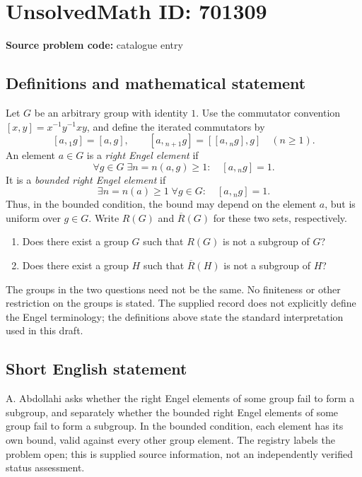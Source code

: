 \documentclass[11pt]{article}
\begin{document}
\section*{UnsolvedMath ID: 701309}
\textbf{Source problem code:} catalogue entry
\subsection{Definitions and mathematical statement}
Let \(G\) be an arbitrary group with identity \(1\). Use the commutator convention \([x,y]=x^{-1}y^{-1}xy\), and define the iterated commutators by
\[
[a,{}_1 g]=[a,g],\qquad [a,{}_{n+1}g]=[[a,{}_n g],g]\quad(n\geq 1).
\]
An element \(a\in G\) is a \emph{right Engel element} if
\[
\forall g\in G\;\exists n=n(a,g)\geq 1:\quad [a,{}_n g]=1.
\]
It is a \emph{bounded right Engel element} if
\[
\exists n=n(a)\geq 1\;\forall g\in G:\quad [a,{}_n g]=1.
\]
Thus, in the bounded condition, the bound may depend on the element \(a\), but is uniform over \(g\in G\). Write \(R(G)\) and \(\overline{R}(G)\) for these two sets, respectively.

\begin{enumerate}
\item[(a)] Does there exist a group \(G\) such that \(R(G)\) is not a subgroup of \(G\)?
\item[(b)] Does there exist a group \(H\) such that \(\overline{R}(H)\) is not a subgroup of \(H\)?
\end{enumerate}
The groups in the two questions need not be the same. No finiteness or other restriction on the groups is stated. The supplied record does not explicitly define the Engel terminology; the definitions above state the standard interpretation used in this draft.
\subsection{Short English statement}
A. Abdollahi asks whether the right Engel elements of some group fail to form a subgroup, and separately whether the bounded right Engel elements of some group fail to form a subgroup. In the bounded condition, each element has its own bound, valid against every other group element. The registry labels the problem open; this is supplied source information, not an independently verified status assessment.
\end{document}
